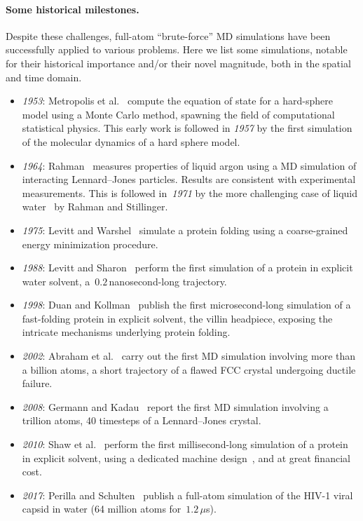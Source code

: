 \paragraph{Some historical milestones.}
\label{par:01:milestones}
Despite these challenges, full-atom ``brute-force'' MD simulations have been successfully applied to various problems. Here we list some simulations, notable for their historical importance and/or their novel magnitude, both in the spatial and time domain.
\begin{itemize}
    \item{\textit{1953}: Metropolis et al.~\cite{MRTT53} compute the equation of state for a hard-sphere model using a Monte Carlo method, spawning the field of computational statistical physics. This early work is followed in \textit{1957} by the first simulation~\cite{AWal57} of the molecular dynamics of a hard sphere model.}
    \item{\textit{1964}: Rahman~\cite{R64} measures properties of liquid argon using a MD simulation of interacting Lennard--Jones particles. Results are consistent with experimental measurements. This is followed in~\textit{1971} by the more challenging case of liquid water~\cite{RS71} by Rahman and Stillinger.}
    \item{\textit{1975}: Levitt and Warshel~\cite{LW75} simulate a protein folding using a coarse-grained energy minimization procedure.}
    \item{\textit{1988}: Levitt and Sharon~\cite{LS88} perform the first simulation of a protein in explicit water solvent, a~$0.2$\,nanosecond-long trajectory.}
    \item{\textit{1998}: Duan and Kollman~\cite{DK98} publish the first microsecond-long simulation of a fast-folding protein in explicit solvent, the villin headpiece, exposing the intricate mechanisms underlying protein folding.}
    \item{\textit{2002}: Abraham et al.~\cite{AWGDDDLRS02} carry out the first MD simulation involving more than a billion atoms, a short trajectory of a flawed FCC crystal undergoing ductile failure.}
    \item{\textit{2008}: Germann and Kadau~\cite{GK08} report the first MD simulation involving a trillion atoms, 40 timesteps of a Lennard--Jones crystal.}
    \item{\textit{2010}: Shaw et al.~\cite{SMLLPDEBJSSal10} perform the first millisecond-long simulation of a protein in explicit solvent, using a dedicated machine design~\cite{SDDKLSYBBCal08}, and at great financial cost.}
    \item{\textit{2017}: Perilla and Schulten~\cite{PS17} publish a full-atom simulation of the HIV-1 viral capsid in water (64 million atoms for~$1.2\,\mu$s).}
\end{itemize}

